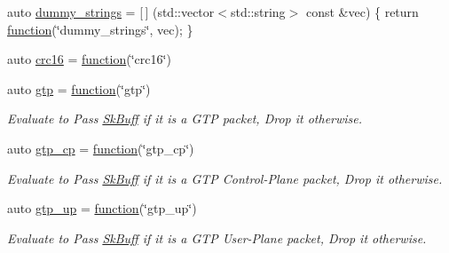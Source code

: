 \begin{DoxyCompactItemize}
\item 
auto \hyperlink{namespacepfq_1_1lang_1_1experimental_1_1anonymous__namespace_02experimental_8hpp_03_af6c041f2494f9dd06acb73d42524e3ad}{dummy\+\_\+strings} = \mbox{[}$\,$\mbox{]} (std\+::vector$<$std\+::string$>$ const \&vec) \{ return \hyperlink{namespacepfq_1_1lang_a1a4638059d700ae08d0ca63886ff2bb3}{function}(\char`\"{}dummy\+\_\+strings\char`\"{}, vec); \}
\item 
auto \hyperlink{namespacepfq_1_1lang_1_1experimental_1_1anonymous__namespace_02experimental_8hpp_03_a8152d34c5c69cc26aaa2b4a14ed37af1}{crc16} = \hyperlink{namespacepfq_1_1lang_a1a4638059d700ae08d0ca63886ff2bb3}{function}(\char`\"{}crc16\char`\"{})
\item 
auto \hyperlink{namespacepfq_1_1lang_1_1experimental_1_1anonymous__namespace_02experimental_8hpp_03_abd26824e1b0e6a31ddbba793b727ef8f}{gtp} = \hyperlink{namespacepfq_1_1lang_a1a4638059d700ae08d0ca63886ff2bb3}{function}(\char`\"{}gtp\char`\"{})
\begin{DoxyCompactList}\small\item\em Evaluate to {\ttfamily Pass} \hyperlink{structpfq_1_1lang_1_1SkBuff}{Sk\+Buff} if it is a G\+TP packet, {\ttfamily Drop} it otherwise. \end{DoxyCompactList}\item 
auto \hyperlink{namespacepfq_1_1lang_1_1experimental_1_1anonymous__namespace_02experimental_8hpp_03_a209a0ce5245cb37a38e0e4c6616e3604}{gtp\+\_\+cp} = \hyperlink{namespacepfq_1_1lang_a1a4638059d700ae08d0ca63886ff2bb3}{function}(\char`\"{}gtp\+\_\+cp\char`\"{})
\begin{DoxyCompactList}\small\item\em Evaluate to {\ttfamily Pass} \hyperlink{structpfq_1_1lang_1_1SkBuff}{Sk\+Buff} if it is a G\+TP Control-\/\+Plane packet, {\ttfamily Drop} it otherwise. \end{DoxyCompactList}\item 
auto \hyperlink{namespacepfq_1_1lang_1_1experimental_1_1anonymous__namespace_02experimental_8hpp_03_ac8b95a754c8c3bbef4847904eaf6cb9b}{gtp\+\_\+up} = \hyperlink{namespacepfq_1_1lang_a1a4638059d700ae08d0ca63886ff2bb3}{function}(\char`\"{}gtp\+\_\+up\char`\"{})
\begin{DoxyCompactList}\small\item\em Evaluate to {\ttfamily Pass} \hyperlink{structpfq_1_1lang_1_1SkBuff}{Sk\+Buff} if it is a G\+TP User-\/\+Plane packet, {\ttfamily Drop} it otherwise. \end{DoxyCompactList}\item 

\end{DoxyCompactItemize}

